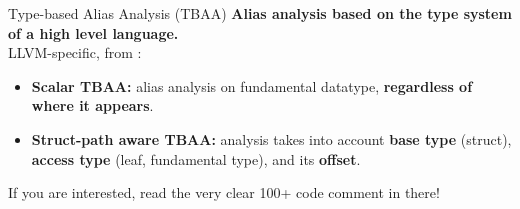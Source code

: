 \begin{frame}{Type-based Alias Analysis (TBAA)}
  \textbf{Alias analysis based on the type system of a high level language.}\\[1em]

  LLVM-specific, from :
  \begin{itemize}
  \item \textbf{Scalar TBAA:} alias analysis on fundamental datatype, \textbf{regardless of where it appears}.

  \item \textbf{Struct-path aware TBAA:} analysis takes into account \textbf{base type} (struct), \textbf{access type} (leaf, fundamental type), and its \textbf{offset}.
  \end{itemize}

  \vfill
  If you are interested, read the very clear 100+ code comment in there!
\end{frame}
